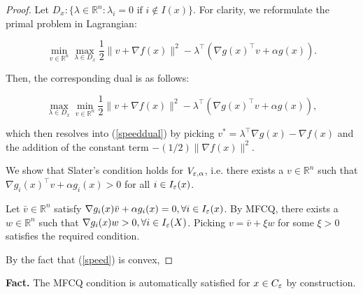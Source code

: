 \documentclass[10pt,a4paper]{article}
\begin{document}
\begin{proof}
    Let $D_x:\{\lambda\in \mathbb{R}^n: \lambda_i=0\text{ if }i\notin I(x)\}$. For clarity, we reformulate the primal problem in Lagrangian:

    \begin{equation} \min\limits_{v\in\mathbb{R}^n} \max\limits_{\lambda\in D_x} \frac{1}{2} \lVert v+ \nabla f(x)\rVert^2-\lambda^{\top}(\nabla g(x)^{\top}v+\alpha g(x)).\end{equation}

    Then, the corresponding dual is as follows:

    \begin{equation} \max\limits_{\lambda\in D_x} \min\limits_{v\in\mathbb{R}^n}  \frac{1}{2} \lVert v+ \nabla f(x)\rVert^2-\lambda^{\top}(\nabla g(x)^{\top}v+\alpha g(x)),\end{equation}

    which then resolves into (\ref{speeddual}) by picking $v^*=\lambda^{\top}\nabla g(x)-\nabla f(x)$ and the addition of the constant term $-(1/2)\lVert\nabla f(x)\rVert^2$.

    We show that Slater's condition holds for $V_{\varepsilon, \alpha}$, i.e. there exists a $v\in \mathbb{R}^n$ such that $\nabla g_i(x)^{\top} v+\alpha g_i(x)>0$ for all $i\in I_\varepsilon(x)$.

    Let $\bar{v}\in \mathbb{R}^n$ satisfy $\nabla g_i(x)\bar{v}+\alpha g_i(x) = 0, \forall i \in I_\varepsilon(x)$. By MFCQ, there exists a $w\in \mathbb{R}^n$ such that $\nabla g_i(x)w>0, \forall i\in I_\varepsilon(X)$. Picking $v=\bar{v}+\xi w$ for some $\xi>0$ satisfies the required condition.

    By the fact that (\ref{speed}) is convex,
\end{proof}











\newpage
\noindent\textbf{Fact.} The MFCQ condition is automatically satisfied for $x\in C_\varepsilon$ by construction.
\end{document}
